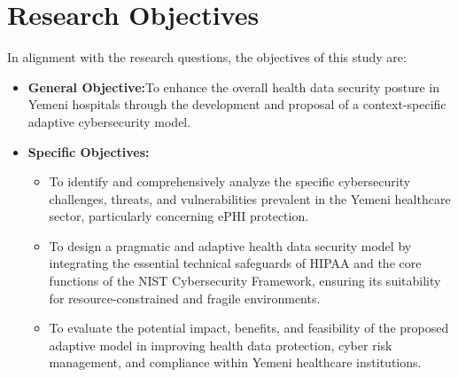 \documentclass[12pt, a4paper, oneside]{report}
\begin{document}
	\section{Research Objectives}
	In alignment with the research questions, the objectives of this study are:
	\begin{itemize}
		\item \textbf{General Objective:}To enhance the overall health data security posture in Yemeni hospitals through the development and proposal of a context-specific adaptive cybersecurity model.
		\item \textbf{Specific Objectives:}
		\begin{itemize}
			\item [-] To identify and comprehensively analyze the specific cybersecurity challenges, threats, and vulnerabilities prevalent in the Yemeni healthcare sector, particularly concerning ePHI protection.
			\item [-] To design a pragmatic and adaptive health data security model by integrating the essential technical safeguards of HIPAA and the core functions of the NIST Cybersecurity Framework, ensuring its suitability for resource-constrained and fragile environments.
			\item [-] To evaluate the potential impact, benefits, and feasibility of the proposed adaptive model in improving health data protection, cyber risk management, and compliance within Yemeni healthcare institutions.
		\end{itemize}
	\end{itemize}
	
\end{document}
